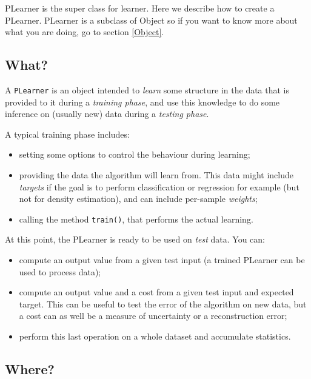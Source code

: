 \documentclass[11pt]{book}
\begin{document}
PLearner is the super class for learner. Here we describe how to create
a PLearner. PLearner is a subclass of Object so if you want to know more
about what you are doing, go to section \ref{Object}.

\subsection{What?}

A {\tt PLearner} is an object intended to {\em learn} some structure in
the data that is provided to it during a {\em training phase}, and use
this knowledge to do some inference on (usually new) data during a {\em
testing phase}.

A typical training phase includes:
\begin{itemize}
  \item setting some options to control the behaviour during learning;

  \item providing the data the algorithm will learn from. This data
  might include {\em targets} if the goal is to perform classification
  or regression for example (but not for density estimation), and can
  include per-sample {\em weights};

  \item calling the method {\tt train()}, that performs the actual learning.
\end{itemize}

At this point, the PLearner is ready to be used on {\em test} data. You can:
\begin{itemize}

  \item compute an output value from a given test input (a trained
  PLearner can be used to process data);

  \item compute an output value and a cost from a given test input and
  expected target. This can be useful to test the error of the algorithm
  on new data, but a cost can as well be a measure of uncertainty or a
  reconstruction error;

  \item perform this last operation on a whole dataset and accumulate
  statistics.

\end{itemize}

\subsection{Where?}
\end{document}
